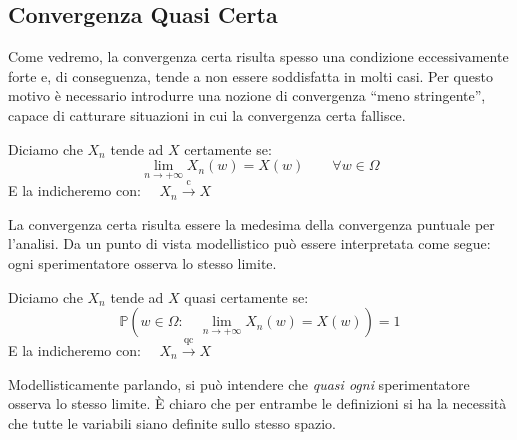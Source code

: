 \subsection{Convergenza Quasi Certa}

Come vedremo, la convergenza certa risulta spesso una condizione eccessivamente forte e, di conseguenza, tende a non essere soddisfatta in molti casi. Per questo motivo è necessario introdurre una nozione di convergenza ``meno stringente'', capace di catturare situazioni in cui la convergenza certa fallisce.

\begin{definizione}
    Diciamo che $X_n$ tende ad $X$ certamente se:
    \[\lim_{n\to+\infty}X_n(w) = X(w)\qquad \forall w\in\Omega\]
    E la indicheremo con: $\quad X_n \overset{\text{c}}{\longrightarrow}X$
\end{definizione}

La convergenza certa risulta essere la medesima della convergenza puntuale per l'analisi. Da un punto di vista modellistico può essere interpretata come segue: ogni sperimentatore osserva lo stesso limite.

\begin{definizione}
    Diciamo che $X_n$ tende ad $X$ quasi certamente se:
    \[\mathbb P\left(w\in\Omega: \quad \lim_{n\to +\infty}X_n (w) = X(w)\right) = 1\]
    E la indicheremo con: $\quad X_n \overset{\text{qc}}{\longrightarrow}X$
\end{definizione}

Modellisticamente parlando, si può intendere che \textit{quasi ogni} sperimentatore osserva lo stesso limite. È chiaro che per entrambe le definizioni si ha la necessità che tutte le variabili siano definite sullo stesso spazio.

